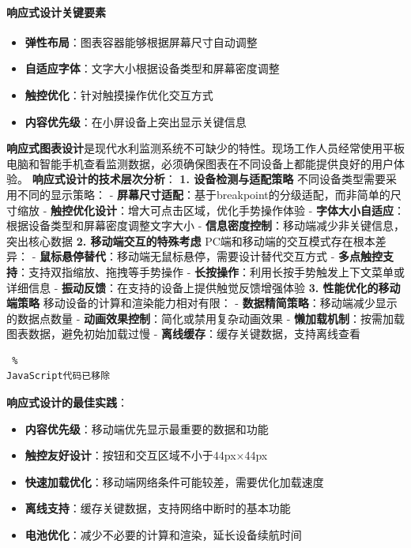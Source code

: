 {{{\paragraph{响应式设计关键要素}\label{ux54cdux5e94ux5f0fux8bbeux8ba1ux5173ux952eux8981ux7d20} \begin{itemize} \tightlist \item
\textbf{弹性布局}：图表容器能够根据屏幕尺寸自动调整 \item \textbf{自适应字体}：文字大小根据设备类型和屏幕密度调整 \item \textbf{触控优化}：针对触摸操作优化交互方式 \item
\textbf{内容优先级}：在小屏设备上突出显示关键信息 \end{itemize}
\textbf{响应式图表设计}是现代水利监测系统不可缺少的特性。现场工作人员经常使用平板电脑和智能手机查看监测数据，必须确保图表在不同设备上都能提供良好的用户体验。 \textbf{响应式设计的技术层次分析}： \textbf{1.
设备检测与适配策略} 不同设备类型需要采用不同的显示策略： - \textbf{屏幕尺寸适配}：基于breakpoint的分级适配，而非简单的尺寸缩放 - \textbf{触控优化设计}：增大可点击区域，优化手势操作体验 -
\textbf{字体大小自适应}：根据设备类型和屏幕密度调整文字大小 - \textbf{信息密度控制}：移动端减少非关键信息，突出核心数据 \textbf{2. 移动端交互的特殊考虑} PC端和移动端的交互模式存在根本差异： -
\textbf{鼠标悬停替代}：移动端无鼠标悬停，需要设计替代交互方式 - \textbf{多点触控支持}：支持双指缩放、拖拽等手势操作 - \textbf{长按操作}：利用长按手势触发上下文菜单或详细信息 -
\textbf{振动反馈}：在支持的设备上提供触觉反馈增强体验 \textbf{3. 性能优化的移动端策略} 移动设备的计算和渲染能力相对有限： - \textbf{数据精简策略}：移动端减少显示的数据点数量 -
\textbf{动画效果控制}：简化或禁用复杂动画效果 - \textbf{懒加载机制}：按需加载图表数据，避免初始加载过慢 - \textbf{离线缓存}：缓存关键数据，支持离线查看 \begin{lstlisting} %
JavaScript代码已移除 \end{lstlisting} \textbf{响应式设计的最佳实践}： \begin{itemize} \tightlist \item \textbf{内容优先级}：移动端优先显示最重要的数据和功能
\item \textbf{触控友好设计}：按钮和交互区域不小于44px×44px \item \textbf{快速加载优化}：移动端网络条件可能较差，需要优化加载速度 \item
\textbf{离线支持}：缓存关键数据，支持网络中断时的基本功能 \item \textbf{电池优化}：减少不必要的计算和渲染，延长设备续航时间 \end{itemize}
}}}

